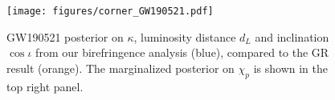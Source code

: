 \documentclass[aps,prd,twocolumn,superscriptaddress,preprintnumbers,nofootinbib]{revtex4-2}
\begin{document}
\begin{figure}
    \texttt{[image: figures/corner\_GW190521.pdf]}
    \caption{
        GW190521 posterior on $\kappa$, luminosity distance $d_L$ and inclination $\cos\iota$ from our birefringence analysis (blue), compared to the GR result (orange).
        The marginalized posterior on $\chi_p$ is shown in the top right panel.
    }
    \label{fig:corner_GW190521}
\end{figure}

% 
% 

% 
% 
\end{document}

